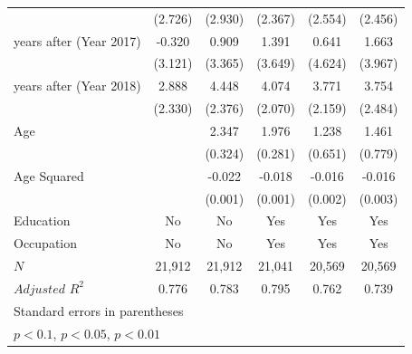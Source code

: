 \documentclass[a4paper,12pt]{article}
\begin{document}
\begin{table}[htbp]
{\begin{tabular}{@{\extracolsep{5pt}}lccccc}
            &     (2.726)         &     (2.930)         &     (2.367)         &     (2.554)         &     (2.456)         \\
\addlinespace
6 years after (Year 2017)&      -0.320         &       0.909         &       1.391         &       0.641         &       1.663         \\
            &     (3.121)         &     (3.365)         &     (3.649)         &     (4.624)         &     (3.967)         \\
\addlinespace
7 years after (Year 2018)&       2.888         &       4.448\sym{*}  &       4.074\sym{*}  &       3.771\sym{*}  &       3.754         \\
            &     (2.330)         &     (2.376)         &     (2.070)         &     (2.159)         &     (2.484)         \\
\addlinespace
Age         &                     &       2.347\sym{***}&       1.976\sym{***}&       1.238\sym{*}  &       1.461\sym{*}  \\
            &                     &     (0.324)         &     (0.281)         &     (0.651)         &     (0.779)         \\
\addlinespace
Age Squared &                     &      -0.022\sym{***}&      -0.018\sym{***}&      -0.016\sym{***}&      -0.016\sym{***}\\
            &                     &     (0.001)         &     (0.001)         &     (0.002)         &     (0.003)         \\
\midrule
Education   &          No         &          No         &         Yes         &         Yes         &         Yes         \\
Occupation  &          No         &          No         &         Yes         &         Yes         &         Yes         \\
$\textit{N}$&      21,912         &      21,912         &      21,041         &      20,569         &      20,569         \\
$\textit{Adjusted R}^2$&       0.776         &       0.783         &       0.795         &       0.762         &       0.739         \\
\bottomrule
\multicolumn{6}{l}{\footnotesize Standard errors in parentheses}\\
\multicolumn{6}{l}{\footnotesize \sym{*} \(p<0.1\), \sym{**} \(p<0.05\), \sym{***} \(p<0.01\)}\\

\end{tabular}}
\end{table}
\end{document}

